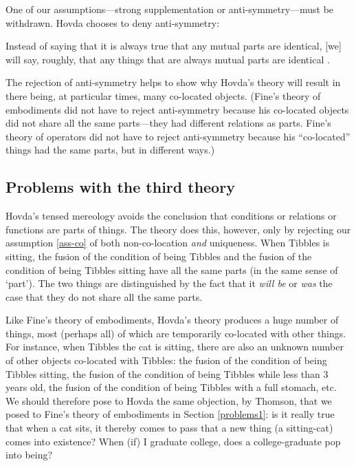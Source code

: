 \documentclass[11pt]{article}
\newenvironment{squote}{%
\begin{spacing}{1}
\begin{list}{}{%
\setlength{\labelwidth}{0pt}%
\rightmargin\leftmargin%
}
\item\relax
}{%
\end{list}%
\end{spacing}
}
\begin{document}
\begin{spacing}{1.5}
One of our assumptions---strong supplementation or
anti-symmetry---must be withdrawn.  Hovda chooses to deny
anti-symmetry:

\begin{squote}
Instead of saying that it is always true that any mutual parts are
identical, [we] will say, roughly, that any things that are always
mutual parts are identical \citep[sec. 3.1.2]{hovda2011}.
\end{squote}

The rejection of anti-symmetry helps to show why Hovda's theory will
result in there being, at particular times, many co-located objects.
(Fine's theory of embodiments did not have to reject anti-symmetry
because his co-located objects did not share all the same parts---they
had different relations as parts.  Fine's theory of operators did not
have to reject anti-symmetry because his ``co-located'' things had the
same parts, but in different ways.)

\subsection{Problems with the third theory}
\label{problems3}
Hovda's tensed mereology avoids the conclusion that conditions or
relations or functions are parts of things.  The theory does this,
however, only by rejecting our assumption \ref{ass-co} of both
non-co-location {\em and} uniqueness.  When Tibbles is sitting, the
fusion of the condition of being Tibbles and the fusion of the
condition of being Tibbles sitting have all the same parts (in the
same sense of `part').  The two things are distinguished by the fact
that it {\em will be} or {\em was} the case that they do not share all
the same parts.

Like Fine's theory of embodiments, Hovda's theory produces a huge
number of things, most (perhaps all) of which are temporarily
co-located with other things.  For instance, when Tibbles the cat is
sitting, there are also an unknown number of other objects co-located
with Tibbles: the fusion of the condition of being Tibbles sitting,
the fusion of the condition of being Tibbles while less than 3 years
old, the fusion of the condition of being Tibbles with a full stomach,
etc.  We should therefore pose to Hovda the same objection, by
Thomson, that we posed to Fine's theory of embodiments in Section
\ref{problems1}: is it really true that when a cat sits, it thereby
comes to pass that a new thing (a sitting-cat) comes into existence?
When (if) I graduate college, does a college-graduate pop into being?


\end{spacing}
\end{document}
